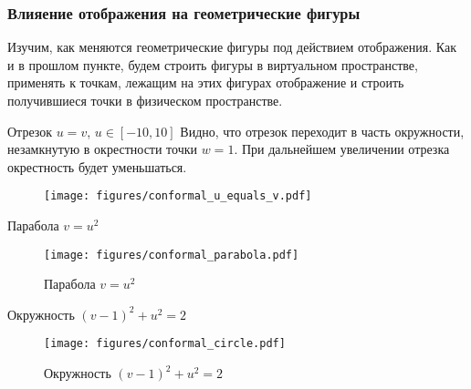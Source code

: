 \begin{frame}\frametitle{Влияение отображения на геометрические фигуры}
	Изучим, как меняются геометрические фигуры под действием отображения.
	Как и в прошлом пункте, будем строить фигуры в виртуальном пространстве,
	применять к точкам, лежащим на этих фигурах отображение и строить
	получившиеся точки в физическом пространстве.
\end{frame}

\begin{frame}{Отрезок \(u = v\), \(u \in [-10, 10]\)}
	Видно, что отрезок переходит в часть окружности, незамкнутую
	в окрестности точки \(w = 1\).
	При дальнейшем увеличении отрезка окрестность будет уменьшаться.
	\begin{figure}
		\centering
		\texttt{[image: figures/conformal\_u\_equals\_v.pdf]}
	\end{figure}
\end{frame}

\begin{frame}{Парабола \(v = u^2\)}
	\begin{figure}
		\centering
		\texttt{[image: figures/conformal\_parabola.pdf]}
		\caption{Парабола \(v=u^2\)}\label{fig:conformal_parabola}
	\end{figure}
\end{frame}

\begin{frame}{Окружность \((v-1)^2 + u^2 = 2\)}
	\begin{figure}
		\centering
		\texttt{[image: figures/conformal\_circle.pdf]}
		\caption{Окружность \((v-1)^2 + u^2 = 2\)}\label{fig:conformal_circle}
	\end{figure}
\end{frame}
